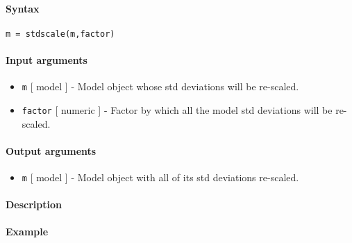 


	\paragraph{Syntax}\label{syntax}

\begin{verbatim}
m = stdscale(m,factor)
\end{verbatim}

\paragraph{Input arguments}\label{input-arguments}

\begin{itemize}
\item
  \texttt{m} {[} model {]} - Model object whose std deviations will be
  re-scaled.
\item
  \texttt{factor} {[} numeric {]} - Factor by which all the model std
  deviations will be re-scaled.
\end{itemize}

\paragraph{Output arguments}\label{output-arguments}

\begin{itemize}
\itemsep1pt\parskip0pt
\item
  \texttt{m} {[} model {]} - Model object with all of its std deviations
  re-scaled.
\end{itemize}

\paragraph{Description}\label{description}

\paragraph{Example}\label{example}


